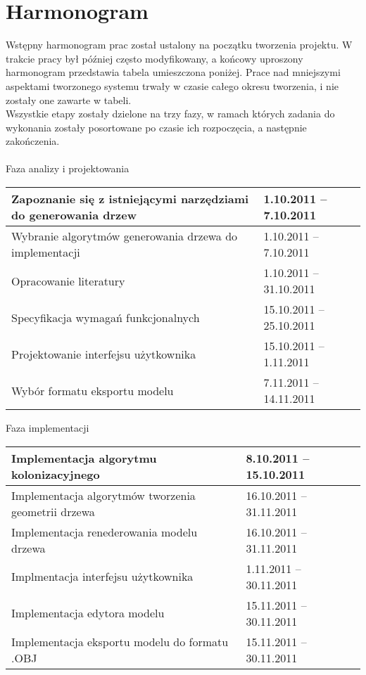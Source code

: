 \section{Harmonogram}
Wstępny harmonogram prac został ustalony na początku tworzenia projektu. W trakcie pracy był później często
modyfikowany, a końcowy uproszony harmonogram przedstawia tabela umieszczona poniżej. Prace nad mniejszymi aspektami
tworzonego systemu trwały w czasie całego okresu tworzenia, i nie zostały one zawarte w tabeli. 
\\\indent Wszystkie etapy zostały dzielone na trzy fazy, w ramach których zadania do wykonania zostały posortowane
po czasie ich rozpoczęcia, a następnie zakończenia.\\ \\
    \indent Faza analizy i projektowania
	\begin{longtable}{|p{85mm}|p{42mm}|} \hline
	

    Zapoznanie się z istniejącymi narzędziami do generowania drzew &
    1.10.2011 -- 7.10.2011
    
    \\ \hline
    Wybranie algorytmów generowania drzewa do implementacji&
    1.10.2011 -- 7.10.2011
    \\ \hline

    Opracowanie literatury&
    1.10.2011 -- 31.10.2011
    \\ \hline

    Specyfikacja wymagań funkcjonalnych&
    15.10.2011 -- 25.10.2011
    \\ \hline
    
    Projektowanie interfejsu użytkownika &
    15.10.2011 -- 1.11.2011
    \\ \hline

    Wybór formatu eksportu modelu &
    7.11.2011 -- 14.11.2011
        \\ \hline

    
    \end{longtable}
	
     Faza implementacji
    \begin{longtable}{|p{85mm}|p{42mm}|} \hline
    Implementacja algorytmu kolonizacyjnego &
    8.10.2011 -- 15.10.2011
    \\ \hline

    Implementacja algorytmów tworzenia geometrii drzewa &
    16.10.2011 -- 31.11.2011 
    \\ \hline

    Implementacja renederowania modelu drzewa &
    16.10.2011 -- 31.11.2011
    \\ \hline

    Implmentacja interfejsu użytkownika &
    1.11.2011 -- 30.11.2011
    \\ \hline

    Implementacja edytora modelu &
    15.11.2011 -- 30.11.2011
    \\ \hline

    Implementacja eksportu modelu do formatu .OBJ&
    15.11.2011 -- 30.11.2011
    \\ \hline
	
   
    
    \end{longtable}
	
